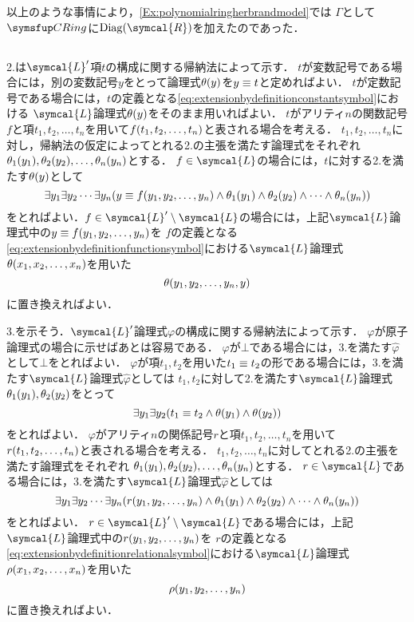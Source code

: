 以上のような事情により，\cref{Ex:polynomialringherbrandmodel}では
\(\Gamma\)として\(\CRing\)に\(\apply{\Diag}{\symcal{R}}\)を加えたのであった．


\subsection*{}

2.は\(\symcal{L}'\)項\(t\)の構成に関する帰納法によって示す．
\(t\)が変数記号である場合には，別の変数記号\(y\)をとって論理式\(\apply{\theta}{y}\)を\(y \equiv t\)と定めればよい．
\(t\)が定数記号である場合には，\(t\)の定義となる\cref{eq:extensionbydefinitionconstantsymbol}における
\(\symcal{L}\)論理式\(\apply{\theta}{y}\)をそのまま用いればよい．
\(t\)がアリティ\(n\)の関数記号\(f\)と項\(t_1,t_2,\dots,t_n\)を用いて\(\apply{f}{t_1,t_2,\dots,t_n}\)と表される場合を考える．
\(t_1,t_2,\dots,t_n\)に対し，帰納法の仮定によってとれる2.の主張を満たす論理式をそれぞれ
\(\apply{\theta_1}{y_1},\apply{\theta_2}{y_2},\dots,\apply{\theta_n}{y_n}\)とする．
\(f \in \symcal{L}\)の場合には，\(t\)に対する2.を満たす\(\apply{\theta}{y}\)として
\[
	\exists y_1 \exists y_2 \dotsb \exists y_n \paren{y \objeq \apply{f}{y_1, y_2, \dots, y_n} \land \apply{\theta_1}{y_1} \land \apply{\theta_2}{y_2} \land \dotsb \land \apply{\theta_n}{y_n}}
\]
をとればよい．\(f \in \symcal{L}' \setminus \symcal{L}\)の場合には，上記\(\symcal{L}\)論理式中の\(y \objeq \apply{f}{y_1, y_2, \dots, y_n}\)を
\(f\)の定義となる\cref{eq:extensionbydefinitionfunctionsymbol}における\(\symcal{L}\)論理式\(\apply{\theta}{x_1,x_2,\dots,x_n}\)を用いた
\[
	\apply{\theta}{y_1,y_2,\dots,y_n,y}
\]
に置き換えればよい．

3.を示そう．\(\symcal{L}'\)論理式\(\varphi\)の構成に関する帰納法によって示す．
\(\varphi\)が原子論理式の場合に示せばあとは容易である．
\(\varphi\)が\(\bot\)である場合には，3.を満たす\(\hat{\varphi}\)として\(\bot\)をとればよい．
\(\varphi\)が項\(t_1,t_2\)を用いた\(t_1 \equiv t_2\)の形である場合には，3.を満たす\(\symcal{L}\)論理式\(\hat{\varphi}\)としては
\(t_1,t_2\)に対して2.を満たす\(\symcal{L}\)論理式\(\apply{\theta_1}{y_1},\apply{\theta_2}{y_2}\)をとって
\[
	\exists y_1 \exists y_2 \paren{t_1 \objeq t_2 \land \apply{\theta}{y_1} \land \apply{\theta}{y_2}}
\]
をとればよい．
\(\varphi\)がアリティ\(n\)の関係記号\(r\)と項\(t_1,t_2,\dots,t_n\)を用いて
\(\apply{r}{t_1,t_2,\dots,t_n}\)と表される場合を考える．
\(t_1,t_2,\dots,t_n\)に対してとれる2.の主張を満たす論理式をそれぞれ
\(\apply{\theta_1}{y_1},\apply{\theta_2}{y_2},\dots,\apply{\theta_n}{y_n}\)とする．
\(r \in \symcal{L}\)である場合には，3.を満たす\(\symcal{L}\)論理式\(\hat{\varphi}\)としては
\[
	\exists y_1 \exists y_2 \dotsb \exists y_n \paren{\apply{r}{y_1,y_2,\dots,y_n} \land \apply{\theta_1}{y_1} \land \apply{\theta_2}{y_2} \land \dotsb \land \apply{\theta_n}{y_n}}
\]
をとればよい．
\(r \in \symcal{L}' \setminus \symcal{L}\)である場合には，上記\(\symcal{L}\)論理式中の\(\apply{r}{y_1,y_2,\dots,y_n}\)を
\(r\)の定義となる\cref{eq:extensionbydefinitionrelationalsymbol}における\(\symcal{L}\)論理式\(\apply{\rho}{x_1,x_2,\dots,x_n}\)を用いた
\[
	\apply{\rho}{y_1,y_2,\dots,y_n}
\]
に置き換えればよい．


